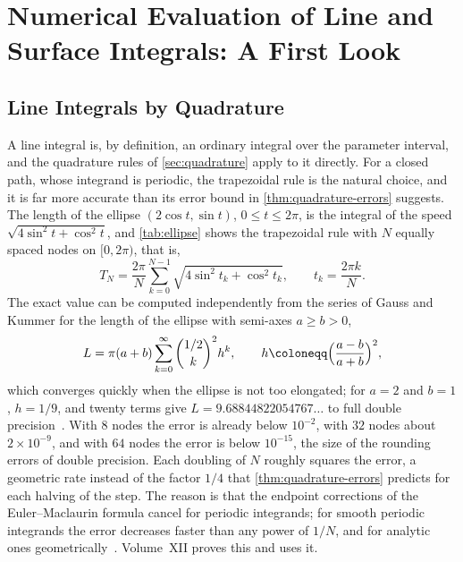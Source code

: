 \section{Numerical Evaluation of Line and Surface Integrals: A First Look}
\label{sec:vector-numerics}

\subsection{Line Integrals by Quadrature}

A line integral is, by definition, an ordinary integral over the parameter interval, and the quadrature rules of \cref{sec:quadrature} apply to it directly. For a closed path, whose integrand is periodic, the trapezoidal rule is the natural choice, and it is far more accurate than its error bound in \cref{thm:quadrature-errors} suggests. The length of the ellipse $(2\cos t,\sin t)$, $0\le t\le2\pi$, is the integral of the speed $\sqrt{4\sin^2t+\cos^2t}$, and \cref{tab:ellipse} shows the trapezoidal rule with $N$ equally spaced nodes on $[0,2\pi)$, that is,
\[
T_N=\frac{2\pi}N\sum_{k=0}^{N-1}\sqrt{4\sin^2t_k+\cos^2t_k},\qquad t_k=\frac{2\pi k}N .
\]
The exact value can be computed independently from the series of Gauss and Kummer for the length of the ellipse with semi-axes $a\ge b>0$,
\begin{equation}
L=\pi(a+b)\sum_{k=0}^\infty\binom{1/2}k^2h^k,\qquad h\coloneqq\Bigl(\frac{a-b}{a+b}\Bigr)^2 ,
\label{eq:gauss-kummer}
\end{equation}
which converges quickly when the ellipse is not too elongated; for $a=2$ and $b=1$, $h=1/9$, and twenty terms give $L=9.68844822054767\ldots$ to full double precision~\cite{almkvist1988}. With $8$ nodes the error is already below $10^{-2}$, with $32$ nodes about $2\times10^{-9}$, and with $64$ nodes the error is below $10^{-15}$, the size of the rounding errors of double precision. Each doubling of $N$ roughly squares the error, a geometric rate instead of the factor $1/4$ that \cref{thm:quadrature-errors} predicts for each halving of the step. The reason is that the endpoint corrections of the Euler--Maclaurin formula cancel for periodic integrands; for smooth periodic integrands the error decreases faster than any power of $1/N$, and for analytic ones geometrically~\cite{trefethen2014}. Volume~XII proves this and uses it.

